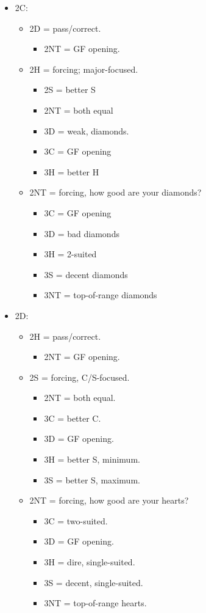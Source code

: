 \documentclass[a4paper,12pt]{article}
\begin{document}
\begin{itemize}
\item 2C:
	\begin{itemize}
   \item 2D = pass/correct.
		\begin{itemize}
      \item 2NT = GF opening.
		\end{itemize}
   \item 2H = forcing; major-focused.
		\begin{itemize}
      \item 2S = better S
      \item 2NT = both equal
      \item 3D = weak, diamonds.
      \item 3C = GF opening
      \item 3H = better H
		\end{itemize}
   \item 2NT = forcing, how good are your diamonds?
		\begin{itemize}
      \item 3C = GF opening
      \item 3D = bad diamonds
      \item 3H = 2-suited
      \item 3S = decent diamonds
      \item 3NT = top-of-range diamonds
		\end{itemize}
	\end{itemize}

\item 2D:
	\begin{itemize}
   \item 2H = pass/correct.
		\begin{itemize}
      \item 2NT = GF opening.
		\end{itemize}
   \item 2S = forcing, C/S-focused.
		\begin{itemize}
      \item 2NT = both equal.
      \item 3C = better C.
      \item 3D = GF opening.
      \item 3H = better S, minimum.
      \item 3S = better S, maximum.
		\end{itemize}
   \item 2NT = forcing, how good are your hearts?
		\begin{itemize}
      \item 3C = two-suited.
      \item 3D = GF opening.
      \item 3H = dire, single-suited.
      \item 3S = decent, single-suited.
      \item 3NT = top-of-range hearts.
		\end{itemize}
	\end{itemize}


\end{itemize}
\end{document}
